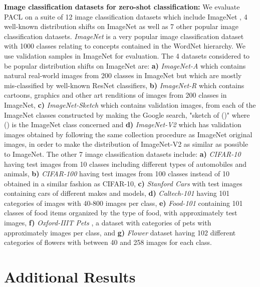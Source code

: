 \documentclass[10pt,twocolumn,letterpaper]{article}
\begin{document}
\textbf{Image classification datasets for zero-shot classification: } We evaluate PACL on a suite of 12 image classification datasets which include ImageNet \cite{deng2009imagenet}, 4 well-known distribution shifts on ImageNet as well as 7 other popular image classification datasets. \emph{ImageNet} is a very popular image classification dataset with 1000 classes relating to concepts contained in the WordNet hierarchy. We use  validation samples in ImageNet for evaluation. The 4 datasets considered to be popular distribution shifts on ImageNet are: \textbf{a)} \emph{ImageNet-A} \cite{hendrycks2021natural} which contains natural real-world images from 200 classes in ImageNet but which are mostly mis-classified by well-known ResNet classifiers, \textbf{b)} \emph{ImageNet-R} \cite{hendrycks2021many} which contains cartoons, graphics and other art renditions of images from 200 classes in ImageNet, \textbf{c)} \emph{ImageNet-Sketch} \cite{wang2019learning} which contains  validation images,  from each of the  ImageNet classes constructed by making the Google search, "sketch of ()" where () is the ImageNet class concerned and \textbf{d)} \emph{ImageNet-V2} \cite{recht2019imagenet} which has  validation images obtained by following the same collection procedure as ImageNet original images, in order to make the distribution of ImageNet-V2 as similar as possible to ImageNet. The other 7 image classification datasets include: \textbf{a)} \emph{CIFAR-10} \cite{krizhevsky2009learning} having  test images from 10 classes including different types of automobiles and animals, \textbf{b)} \emph{CIFAR-100} \cite{krizhevsky2009learning} having  test images from 100 classes instead of 10 obtained in a similar fashion as CIFAR-10, \textbf{c)} \emph{Stanford Cars} \cite{KrauseStarkDengFei-Fei_3DRR2013} with  test images containing cars of different makes and models, \textbf{d)} \emph{Caltech-101} \cite{caltech101} having 101 categories of images with 40-800 images per class, \textbf{e)} \emph{Food-101} \cite{bossard14} containing 101 classes of food items organized by the type of food, with approximately  test images, \textbf{f)} \emph{Oxford-IIIT Pets} \cite{parkhi12a}, a dataset with  categories of pets with approximately  images per class, and \textbf{g)} \emph{Flower} dataset \cite{Nilsback08} having 102 different categories of flowers with between 40 and 258 images for each class.


\section{Additional Results}
\label{app:additional_results}
\end{document}
